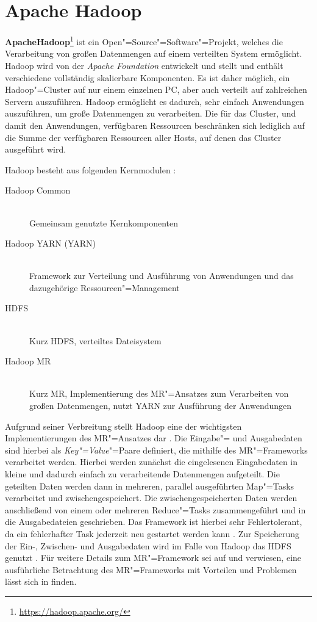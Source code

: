 \section{Apache Hadoop}
\label{sec:hadoop}

\textbf{Apache\texttrademark Hadoop\textregistered}\footnote{\url{https://hadoop.apache.org/}} ist ein Open"=Source"=Software"=Projekt, welches die Verarbeitung von großen Datenmengen auf einem verteilten System ermöglicht.
Hadoop wird von der \emph{Apache Foundation} entwickelt und stellt und enthält verschiedene vollständig skalierbare Komponenten.
Es ist daher möglich, ein Hadoop"=Cluster auf nur einem einzelnen PC, aber auch verteilt auf zahlreichen Servern auszuführen.
Hadoop ermöglicht es dadurch, sehr einfach Anwendungen auszuführen, um große Datenmengen zu verarbeiten.
Die für das Cluster, und damit den Anwendungen, verfügbaren Ressourcen beschränken sich lediglich auf die Summe der verfügbaren Ressourcen aller Hosts, auf denen das Cluster ausgeführt wird.

Hadoop besteht aus folgenden Kernmodulen \cite{HadoopHomePage}:

\begin{description}
	\item[Hadoop Common] \hfill \\
        Gemeinsam genutzte Kernkomponenten
	\item[Hadoop \acs{YARN} (\acl{YARN})] \hfill \\
        Framework zur Verteilung und Ausführung von Anwendungen und das dazugehörige Ressourcen"=Management
	\item[\acl{HDFS}] \hfill \\
        Kurz \acs{HDFS}, verteiltes Dateisystem
	\item[Hadoop \acl{MR}] \hfill \\
        Kurz \acs{MR}, Implementierung des \ac{MR}"=Ansatzes zum Verarbeiten von großen Datenmengen, nutzt \ac{YARN} zur Ausführung der Anwendungen
\end{description}

Aufgrund seiner Verbreitung stellt Hadoop eine der wichtigsten Implementierungen des \ac{MR}"=Ansatzes dar \cite{PoweredByHadoop}.
Die Eingabe"= und Ausgabedaten sind hierbei als \emph{Key"=Value}"=Paare definiert, die mithilfe des \ac{MR}"=Frameworks verarbeitet werden.
Hierbei werden zunächst die eingelesenen Eingabedaten in kleine und dadurch einfach zu verarbeitende Datenmengen aufgeteilt.
Die geteilten Daten werden dann in mehreren, parallel ausgeführten Map"=Tasks verarbeitet und zwischengespeichert.
Die zwischengespeicherten Daten werden anschließend von einem oder mehreren Reduce"=Tasks zusammengeführt und in die Ausgabedateien geschrieben.
Das Framework ist hierbei sehr Fehlertolerant, da ein fehlerhafter Task jederzeit neu gestartet werden kann \cite{Dean2008,Dean2010}.
Zur Speicherung der Ein-, Zwischen- und Ausgabedaten wird im Falle von Hadoop das \ac{HDFS} genutzt \cite{HadoopMapRedTutorial271}.
Für weitere Details zum \ac{MR}"=Framework sei auf \cite{Dean2008} und \cite{Dean2010} verwiesen, eine ausführliche Betrachtung des \ac{MR}"=Frameworks mit Vorteilen und Problemen lässt sich in \cite{Lee2012} finden.

